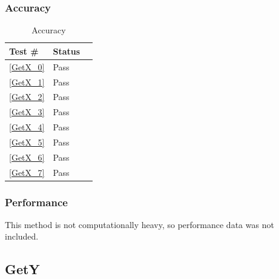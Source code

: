 \documentclass[12pt]{article}
\begin{document}
	\subsubsection{Accuracy}
		\begin{table}[H]
		\centering
		\caption{Accuracy}\label{GetX_acc}
		\begin{tabular}{lll}
		\toprule
		\bf Test \# & Status\\\midrule
		\ref{GetX_0} & Pass\\
		\ref{GetX_1} & Pass\\
		\ref{GetX_2} & Pass\\
		\ref{GetX_3} & Pass\\
		\ref{GetX_4} & Pass\\
		\ref{GetX_5} & Pass\\
		\ref{GetX_6} & Pass\\
		\ref{GetX_7} & Pass\\
		\bottomrule
		\end{tabular}
		\end{table}
	\subsubsection{Performance}
		This method is not computationally heavy, so performance data was not included.

\subsection{GetY}
\end{document}
